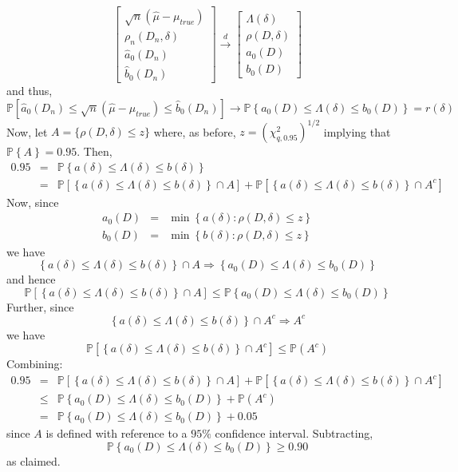 \documentclass[12pt]{article}
\theoremstyle{definition}
\newcommand{\p}{\mathbb{P}}
\begin{document}
	$$
	\left[\begin{array}{c}
		\sqrt{n}(\hat{\mu} - \mu_{true})\\
		\rho_n(D_n,\delta)\\
		\widehat{a}_0(D_n)\\
		\widehat{b}_0(D_n)
\end{array}\right] \overset{d}{\rightarrow}
		\left[\begin{array}{c}
		\Lambda(\delta)\\
		\rho(D,\delta)\\
		a_0(D)\\
		b_0(D)
\end{array}\right] 	
$$
and thus, 
	$$\p\left[  \widehat{a}_0(D_n) \leq \sqrt{n}\left( \widehat{\mu}-\mu_{true}\right)\leq  \widehat{b}_0(D_n) \right] \rightarrow\p \left\{ a_0(D) \leq \Lambda(\delta) \leq b_0(D)\right\} = r(\delta)$$
Now, let $A = \{  \rho(D,\delta)\leq z\}$ where, as before, $z = (\chi^2_{q,0.95})^{1/2}$ implying that $\p\left\{A  \right\}=0.95$. Then,
	\begin{eqnarray*}
		0.95 &=& \p\left\{a(\delta) \leq \Lambda(\delta) \leq b(\delta)  \right\}\\
			&=& \p\left[\left\{a(\delta) \leq \Lambda(\delta) \leq b(\delta)  \right\}\cap A \right] + \p\left[\left\{a(\delta) \leq \Lambda(\delta) \leq b(\delta)  \right\}\cap A^c \right] 
\end{eqnarray*}
Now, since
		\begin{eqnarray*}
		a_0(D)&=&\min \left\{a(\delta)\colon \rho(D, \delta) \leq z\right\}\\
		b_0(D)&=&\min \left\{b(\delta)\colon \rho(D, \delta) \leq z\right\}
\end{eqnarray*}
we have
$$\left\{a(\delta) \leq \Lambda(\delta) \leq b(\delta)  \right\}\cap A \Rightarrow \left\{a_0(D)  \leq \Lambda(\delta) \leq b_0(D)\right\}$$
and hence
	$$\p\left[\left\{a(\delta) \leq \Lambda(\delta) \leq b(\delta)  \right\}\cap A \right]  \leq \p \left\{a_0(D)  \leq \Lambda(\delta) \leq b_0(D)\right\}$$
Further, since
	$$\left\{a(\delta) \leq \Lambda(\delta) \leq b(\delta)  \right\}\cap A^c \Rightarrow A^c$$
we have
	$$\p\left[\left\{a(\delta) \leq \Lambda(\delta) \leq b(\delta)  \right\}\cap A^c \right]  \leq \p(A^c)$$
Combining:
		\begin{eqnarray*}
		0.95 &=& \p\left[\left\{a(\delta) \leq \Lambda(\delta) \leq b(\delta)  \right\}\cap A \right] + \p\left[\left\{a(\delta) \leq \Lambda(\delta) \leq b(\delta)  \right\}\cap A^c \right] \\
			&\leq&  \p \left\{a_0(D)  \leq \Lambda(\delta) \leq b_0(D)\right\} + \p(A^c)\\
			&=& \p \left\{a_0(D)  \leq \Lambda(\delta) \leq b_0(D)\right\} + 0.05
\end{eqnarray*}
since $A$ is defined with reference to a $95\%$ confidence interval. Subtracting, 
	$$\p \left\{a_0(D)  \leq \Lambda(\delta) \leq b_0(D)\right\} \geq 0.90$$
as claimed.
\end{document}
